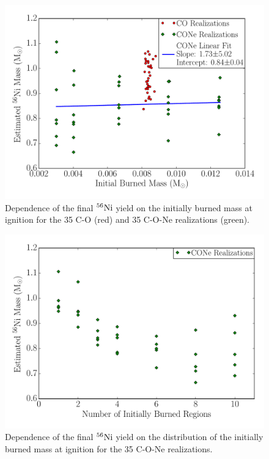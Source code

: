 \documentclass[iop,apj]{emulateapj}
\newcommand{\Ni}[1]{\ensuremath{{}^{#1}{\rm Ni}}}
\begin{document}
\begin{figure}[!ht]
	\includegraphics[width=\linewidth]{figures/cf_initcond_rhoddt-7.2/ni56_initial-burned-mass_scatter.pdf}
	\caption{\label{fig:co_vs_cone_ignition_bm} Dependence of the
          final \Ni{56} yield on the initially burned mass at ignition
          for the 35 C-O (red) and 35 C-O-Ne realizations (green).}
\end{figure}

\begin{figure}[!ht]
	\includegraphics[width=\linewidth]{figures/cf_initcond_rhoddt-7.2/ni56_mpoles_scatter.pdf}
	\caption{\label{fig:cone_ignition_mp} Dependence of the final
          \Ni{56} yield on the distribution of the initially burned
          mass at ignition for the 35 C-O-Ne realizations.}
\end{figure}
\end{document}
